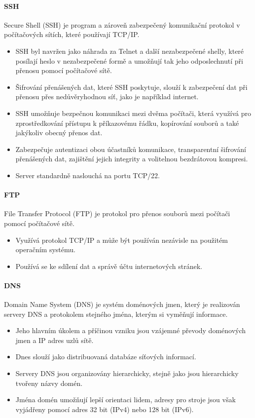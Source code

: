 \paragraph{SSH}
Secure Shell (SSH) je program a zároveň zabezpečený komunikační protokol v počítačových sítích, které používají TCP/IP.
\begin{itemize}
    \item SSH byl navržen jako náhrada za Telnet a další nezabezpečené shelly, které posílají heslo v nezabezpečené formě a umožňují tak jeho odposlechnutí při přenosu pomocí počítačové sítě.
    \item Šifrování přenášených dat, které SSH poskytuje, slouží k zabezpečení dat při přenosu přes nedůvěryhodnou síť, jako je například internet.
    \item SSH umožňuje bezpečnou komunikaci mezi dvěma počítači, která využívá pro zprostředkování přístupu k příkazovému řádku, kopírování souborů a také jakýkoliv obecný přenos dat.
    \item Zabezpečuje autentizaci obou účastníků komunikace, transparentní šifrování přenášených dat, zajištění jejich integrity a volitelnou bezdrátovou kompresi.
    \item Server standardně naslouchá na portu TCP/22.
\end{itemize}
\paragraph{FTP}
File Transfer Protocol (FTP) je protokol pro přenos souborů mezi počítači pomocí počítačové sítě.
\begin{itemize}
    \item Využívá protokol TCP/IP a může být používán nezávisle na použitém operačním systému.
    \item Používá se ke sdílení dat a správě účtu internetových stránek.
\end{itemize}

\paragraph{DNS}
Domain Name System (DNS) je systém doménových jmen, který je realizován servery DNS a protokolem stejného jména, kterým si vyměňují informace.
\begin{itemize}
    \item Jeho hlavním úkolem a příčinou vzniku jsou vzájemné převody doménových jmen a IP adres uzlů sítě.
    \item Dnes slouží jako distribuovaná databáze síťových informací.
    \item Servery DNS jsou organizovány hierarchicky, stejně jako jsou hierarchicky tvořeny názvy domén.
    \item Jména domén umožňují lepší orientaci lidem, adresy pro stroje jsou však vyjádřeny pomocí adres 32 bit (IPv4) nebo 128 bit (IPv6).
\end{itemize}

